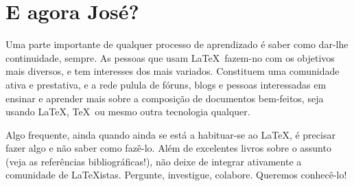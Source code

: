 \section{E agora José?}

Uma parte importante de qualquer processo de aprendizado é saber como
dar-lhe continuidade, sempre. As pessoas que usam \LaTeX\ fazem-no com
os objetivos mais diversos, e tem interesses dos mais
variados. Constituem uma comunidade ativa e prestativa, e a rede
pulula de fóruns, blogs e pessoas interessadas em ensinar e aprender
mais sobre a composição de documentos bem-feitos, seja usando \LaTeX,
\TeX\ ou mesmo outra tecnologia qualquer.

Algo frequente, ainda quando ainda se está a habituar-se ao \LaTeX, é
precisar fazer algo e não saber como fazê-lo. Além de excelentes
livros sobre o assunto (veja as referências bibliográficas!), não
deixe de integrar ativamente a comunidade de \LaTeX istas. Pergunte,
investigue, colabore. Queremos conhecê-lo!

